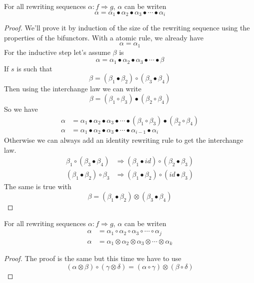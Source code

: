 \documentclass[a4paper]{article}
\begin{document}
\begin{proposition}
  For all rewriting sequences $\alpha: f \Rightarrow g$, $\alpha$ can be writen
  \[
    \alpha = \alpha_1 \bullet \alpha_2 \bullet \alpha_3 \bullet \cdots \bullet
      \alpha_i
  \]
  
  \begin{proof}
    We'll prove it by induction of the size of the rewriting sequence using the
      properties of the bifunctors.
    With a atomic rule, we already have
    \[
      \alpha = \alpha_1
    \]
    For the inductive step let's assume $\beta$ is
    \[
      \alpha = \alpha_1 \bullet \alpha_2 \bullet \alpha_3 \bullet \cdots \bullet
        \beta
    \]
    If $s$ is such that
    \[
      \beta = (\beta_1 \bullet \beta_2) \circ (\beta_3 \bullet \beta_4)
    \]
    Then using the interchange law we can write
    \[
      \beta = (\beta_1 \circ \beta_3) \bullet (\beta_2 \circ \beta_4)
    \]
    So we have 
    \begin{align}
      \alpha &= \alpha_1 \bullet \alpha_2 \bullet \alpha_3 \bullet \cdots
        \bullet (\beta_1 \circ \beta_3) \bullet (\beta_2 \circ \beta_4) \\
      \alpha &= \alpha_1 \bullet \alpha_2 \bullet \alpha_3 \bullet \cdots
        \bullet \alpha_{i - 1} \bullet \alpha_i
    \end{align}
    Otherwise we can always add an identity rewriting rule to get the
      interchange law.
    \begin{align}
      \beta_1 \circ (\beta_3 \bullet \beta_4) &\Rightarrow (\beta_1 \bullet id)
        \circ (\beta_2 \bullet \beta_3) \\
      (\beta_1 \bullet \beta_2) \circ \beta_3 &\Rightarrow (\beta_1 \bullet
        \beta_2) \circ (id \bullet \beta_3)
    \end{align}
    The same is true with
    \[
      \beta = (\beta_1 \bullet \beta_2) \otimes (\beta_3 \bullet \beta_4)
    \]
  \end{proof}
\end{proposition}

\begin{proposition}
  For all rewriting sequences $\alpha: f \Rightarrow g$, $\alpha$ can be writen
  \begin{align}
    \alpha &= \alpha_1 \circ \alpha_2 \circ \alpha_3 \circ \cdots \circ \alpha_j
      \\
    \alpha &= \alpha_1 \otimes \alpha_2 \otimes \alpha_3 \otimes \cdots \otimes
      \alpha_k
  \end{align}
  
  \begin{proof}
    The proof is the same but this time we have to use
    \[
      (\alpha \otimes \beta) \circ (\gamma \otimes \delta) = (\alpha \circ
        \gamma) \otimes (\beta \circ \delta)
    \]
  \end{proof}
\end{proposition}
\end{document}
